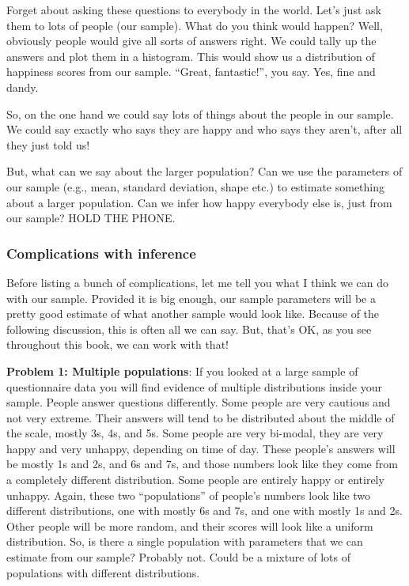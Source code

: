 \documentclass[
]{book}
\begin{document}
Forget about asking these questions to everybody in the world. Let's just ask them to lots of people (our sample). What do you think would happen? Well, obviously people would give all sorts of answers right. We could tally up the answers and plot them in a histogram. This would show us a distribution of happiness scores from our sample. ``Great, fantastic!'', you say. Yes, fine and dandy.

So, on the one hand we could say lots of things about the people in our sample. We could say exactly who says they are happy and who says they aren't, after all they just told us!

But, what can we say about the larger population? Can we use the parameters of our sample (e.g., mean, standard deviation, shape etc.) to estimate something about a larger population. Can we infer how happy everybody else is, just from our sample? HOLD THE PHONE.

\hypertarget{complications-with-inference}{%
\subsubsection{Complications with inference}\label{complications-with-inference}}

Before listing a bunch of complications, let me tell you what I think we can do with our sample. Provided it is big enough, our sample parameters will be a pretty good estimate of what another sample would look like. Because of the following discussion, this is often all we can say. But, that's OK, as you see throughout this book, we can work with that!

\textbf{Problem 1: Multiple populations}: If you looked at a large sample of questionnaire data you will find evidence of multiple distributions inside your sample. People answer questions differently. Some people are very cautious and not very extreme. Their answers will tend to be distributed about the middle of the scale, mostly 3s, 4s, and 5s. Some people are very bi-modal, they are very happy and very unhappy, depending on time of day. These people's answers will be mostly 1s and 2s, and 6s and 7s, and those numbers look like they come from a completely different distribution. Some people are entirely happy or entirely unhappy. Again, these two ``populations'' of people's numbers look like two different distributions, one with mostly 6s and 7s, and one with mostly 1s and 2s. Other people will be more random, and their scores will look like a uniform distribution. So, is there a single population with parameters that we can estimate from our sample? Probably not. Could be a mixture of lots of populations with different distributions.
\end{document}
